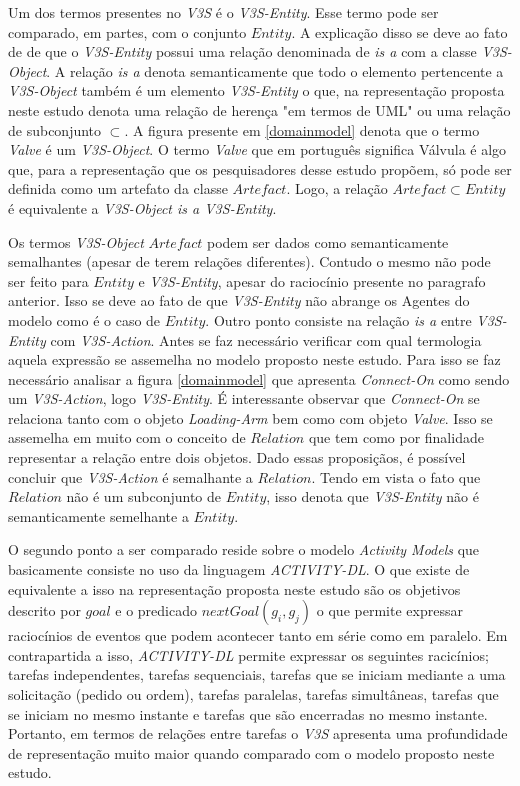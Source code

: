 Um dos termos presentes no \textit{V3S} é o \textit{V3S-Entity}. Esse termo pode ser comparado, em partes, com o conjunto $ Entity $. A explicação disso se deve ao fato de de que o \textit{V3S-Entity} possui uma relação denominada de 
\textit{is a} com a classe \textit{V3S-Object}. A relação \textit{is a} denota semanticamente que todo o elemento pertencente a \textit{V3S-Object} também é um elemento \textit{V3S-Entity} o que, na representação proposta neste estudo denota 
uma relação de herença "em termos de UML" ou uma relação de subconjunto $ \subset $. A figura presente em \ref{domainmodel} denota que o termo \textit{Valve} é um \textit{V3S-Object}. O termo \textit{Valve} que em português significa Válvula é 
algo que, para a representação que os pesquisadores desse estudo propõem, só pode ser definida como um artefato da classe $Artefact$. Logo, a relação $Artefact \subset Entity $ é equivalente a \textit{V3S-Object is a V3S-Entity}.

Os termos \textit{V3S-Object} $Artefact$ podem ser dados como semanticamente semalhantes (apesar de terem relações diferentes). Contudo o mesmo não pode ser feito para $Entity$ e \textit{V3S-Entity}, apesar do raciocínio presente no paragrafo anterior. Isso se deve ao fato de que \textit{V3S-Entity} não abrange os Agentes do modelo como é o caso de $Entity$. Outro ponto consiste na relação \textit{is a} entre \textit{V3S-Entity} com \textit{V3S-Action}. Antes se faz necessário verificar com qual termologia aquela expressão se assemelha no modelo proposto neste estudo. Para isso se faz necessário analisar a figura \ref{domainmodel} que apresenta \textit{Connect-On} como sendo um \textit{V3S-Action}, logo \textit{V3S-Entity}. É interessante observar que 
\textit{Connect-On} se relaciona tanto com o objeto \textit{Loading-Arm} bem como com objeto \textit{Valve}. Isso se assemelha em muito com o conceito de $Relation$ que tem como por finalidade 
representar a relação entre dois objetos. Dado essas proposiçãos, é possível concluir que \textit{V3S-Action} é semalhante a $Relation$. Tendo em vista o fato que $Relation$ não é um subconjunto 
de $Entity$, isso denota que \textit{V3S-Entity} não é semanticamente semelhante a $Entity$. 

O segundo ponto a ser comparado reside sobre o modelo \textit{Activity Models} que basicamente consiste no uso da linguagem \textit{ACTIVITY-DL}. O que existe de equivalente a isso na representação proposta neste estudo são os objetivos descrito por $goal$ e o predicado $nextGoal(g_i,g_j)$ o que permite expressar raciocínios de eventos que podem acontecer tanto em série 
como em paralelo. Em contrapartida a isso, \textit{ACTIVITY-DL} permite expressar os seguintes racicínios; tarefas independentes, tarefas sequenciais, tarefas que se iniciam mediante a uma solicitação (pedido ou ordem), tarefas paralelas, tarefas simultâneas, tarefas que se iniciam no mesmo instante e tarefas que são encerradas no mesmo instante. Portanto, em termos de relações entre tarefas o \textit{V3S} apresenta uma profundidade de representação muito maior quando comparado com o modelo proposto neste estudo. 

